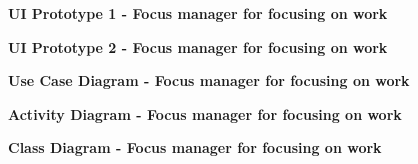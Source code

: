 \documentclass{article}
\begin{document}
		\begin{figure}[htbp]
			\centering
			\textbf{UI Prototype 1 - Focus manager for focusing on work}
			\begin{subfigure}{\textwidth}
				\centering
				
			\end{subfigure}
			\begin{subfigure}{\textwidth}
			\end{subfigure}
		\end{figure}
		\begin{figure}[htbp]
			\centering
			\textbf{UI Prototype 2 - Focus manager for focusing on work}
			\begin{subfigure}{\textwidth}
				\centering
				
			\end{subfigure}
			\begin{subfigure}{\textwidth}
			\end{subfigure}
		\end{figure}
		\clearpage
	
	
		\begin{figure}[htbp]
			\centering
			\textbf{Use Case Diagram - Focus manager for focusing on work}
			\begin{subfigure}{\textwidth}
				\centering
				
			\end{subfigure}
			\begin{subfigure}{\textwidth}
			\end{subfigure}
		\end{figure}
		\clearpage
		
		\begin{figure}[htbp]
			\centering
			\textbf{Activity Diagram - Focus manager for focusing on work}
			\begin{subfigure}{\textwidth}
				\centering
				
			\end{subfigure}
			\begin{subfigure}{\textwidth}
			\end{subfigure}
		\end{figure}
		\clearpage
		
		\begin{figure}[htbp]
			\centering
			\textbf{Class Diagram - Focus manager for focusing on work}
			\begin{subfigure}{\textwidth}
				\centering
				
			\end{subfigure}
			\begin{subfigure}{\textwidth}
				\vspace{1em}
				\end{subfigure}
		\end{figure}
		\clearpage
		
\end{document}
